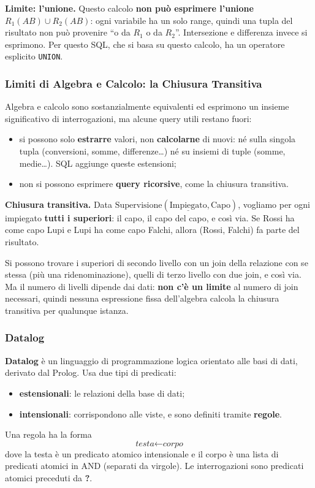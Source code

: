 \documentclass[12pt]{extarticle}
\begin{document}
\noindent \textbf{Limite: l'unione.} Questo calcolo \textbf{non può esprimere l'unione} $R_1(AB) \cup R_2(AB)$: ogni variabile ha un solo range, quindi una tupla del risultato non può provenire ``o da $R_1$ o da $R_2$''. Intersezione e differenza invece si esprimono. Per questo SQL, che si basa su questo calcolo, ha un operatore esplicito \texttt{UNION}.

\subsubsection{Limiti di Algebra e Calcolo: la Chiusura Transitiva}
\noindent Algebra e calcolo sono sostanzialmente equivalenti ed esprimono un insieme significativo di interrogazioni, ma alcune query utili restano fuori:
\begin{itemize}
    \item si possono solo \textbf{estrarre} valori, non \textbf{calcolarne} di nuovi: né sulla singola tupla (conversioni, somme, differenze\dots) né su insiemi di tuple (somme, medie\dots). SQL aggiunge queste estensioni;
    \item non si possono esprimere \textbf{query ricorsive}, come la chiusura transitiva.
\end{itemize}

\noindent \textbf{Chiusura transitiva.} Data $\text{Supervisione}(\underline{\text{Impiegato}}, \text{Capo})$, vogliamo per ogni impiegato \textbf{tutti i superiori}: il capo, il capo del capo, e così via. Se Rossi ha come capo Lupi e Lupi ha come capo Falchi, allora (Rossi, Falchi) fa parte del risultato.

\medskip
\noindent Si possono trovare i superiori di secondo livello con un join della relazione con se stessa (più una ridenominazione), quelli di terzo livello con due join, e così via. Ma il numero di livelli dipende dai dati: \textbf{non c'è un limite} al numero di join necessari, quindi nessuna espressione fissa dell'algebra calcola la chiusura transitiva per qualunque istanza.

\subsubsection{Datalog}
\noindent \textbf{Datalog} è un linguaggio di programmazione logica orientato alle basi di dati, derivato dal Prolog. Usa due tipi di predicati:
\begin{itemize}
    \item \textbf{estensionali}: le relazioni della base di dati;
    \item \textbf{intensionali}: corrispondono alle viste, e sono definiti tramite \textbf{regole}.
\end{itemize}
Una regola ha la forma
\[
\textit{testa} \leftarrow \textit{corpo}
\]
dove la testa è un predicato atomico intensionale e il corpo è una lista di predicati atomici in AND (separati da virgole). Le interrogazioni sono predicati atomici preceduti da \textbf{?}.
\end{document}
